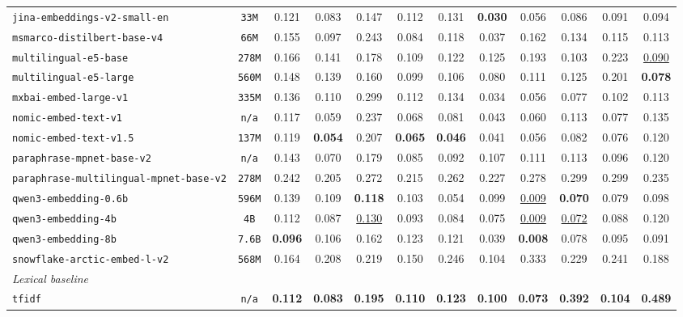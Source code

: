\documentclass{article}
\begin{document}
\begin{table}[htbp]
{\begin{tabular}{lccccccccccc}
\texttt{jina-embeddings-v2-small-en} & \texttt{33M} & 0.121 & 0.083 & 0.147 & 0.112 & 0.131 & \textbf{0.030} & 0.056 & 0.086 & 0.091 & 0.094 \\
\texttt{msmarco-distilbert-base-v4} & \texttt{66M} & 0.155 & 0.097 & 0.243 & 0.084 & 0.118 & 0.037 & 0.162 & 0.134 & 0.115 & 0.113 \\
\texttt{multilingual-e5-base} & \texttt{278M} & 0.166 & 0.141 & 0.178 & 0.109 & 0.122 & 0.125 & 0.193 & 0.103 & 0.223 & \underline{0.090} \\
\texttt{multilingual-e5-large} & \texttt{560M} & 0.148 & 0.139 & 0.160 & 0.099 & 0.106 & 0.080 & 0.111 & 0.125 & 0.201 & \textbf{0.078} \\
\texttt{mxbai-embed-large-v1} & \texttt{335M} & 0.136 & 0.110 & 0.299 & 0.112 & 0.134 & 0.034 & 0.056 & 0.077 & 0.102 & 0.113 \\
\texttt{nomic-embed-text-v1} & \texttt{n/a} & 0.117 & 0.059 & 0.237 & 0.068 & 0.081 & 0.043 & 0.060 & 0.113 & 0.077 & 0.135 \\
\texttt{nomic-embed-text-v1.5} & \texttt{137M} & 0.119 & \textbf{0.054} & 0.207 & \textbf{0.065} & \textbf{0.046} & 0.041 & 0.056 & 0.082 & 0.076 & 0.120 \\
\texttt{paraphrase-mpnet-base-v2} & \texttt{n/a} & 0.143 & 0.070 & 0.179 & 0.085 & 0.092 & 0.107 & 0.111 & 0.113 & 0.096 & 0.120 \\
\texttt{paraphrase-multilingual-mpnet-base-v2} & \texttt{278M} & 0.242 & 0.205 & 0.272 & 0.215 & 0.262 & 0.227 & 0.278 & 0.299 & 0.299 & 0.235 \\
\texttt{qwen3-embedding-0.6b} & \texttt{596M} & 0.139 & 0.109 & \textbf{0.118} & 0.103 & 0.054 & 0.099 & \underline{0.009} & \textbf{0.070} & 0.079 & 0.098 \\
\texttt{qwen3-embedding-4b} & \texttt{4B} & 0.112 & 0.087 & \underline{0.130} & 0.093 & 0.084 & 0.075 & \underline{0.009} & \underline{0.072} & 0.088 & 0.120 \\
\texttt{qwen3-embedding-8b} & \texttt{7.6B} & \textbf{0.096} & 0.106 & 0.162 & 0.123 & 0.121 & 0.039 & \textbf{0.008} & 0.078 & 0.095 & 0.091 \\
\texttt{snowflake-arctic-embed-l-v2} & \texttt{568M} & 0.164 & 0.208 & 0.219 & 0.150 & 0.246 & 0.104 & 0.333 & 0.229 & 0.241 & 0.188 \\
\midrule
\multicolumn{12}{l}{\textit{Lexical baseline}} \\
\midrule
\texttt{tfidf} & \texttt{n/a} & \textbf{0.112} & \textbf{0.083} & \textbf{0.195} & \textbf{0.110} & \textbf{0.123} & \textbf{0.100} & \textbf{0.073} & \textbf{0.392} & \textbf{0.104} & \textbf{0.489} \\

\end{tabular}}
\end{table}
\end{document}
